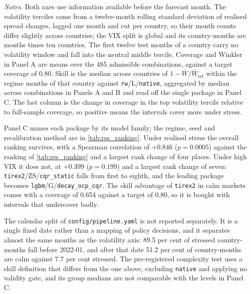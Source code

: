 \begin{table}[t]
\vspace{4pt}
{\footnotesize
\begin{minipage}{0.98\textwidth}
\textit{Notes.} Both axes use information available before the forecast month. The
volatility terciles come from a twelve-month rolling standard deviation of realised
spread changes, lagged one month and cut per country, so their month counts differ
slightly across countries; the VIX split is global and its country-months are months
times ten countries. The first twelve test months of a country carry no volatility
window and fall into the neutral middle tercile. Coverage and Winkler in Panel A are
means over the 485 admissible combinations, against a target coverage of 0.80. Skill
is the median across countries of $1-\bar W/\bar W_{\mathrm{ref}}$ within the regime
months of that country against \texttt{rw}/L/\texttt{native}, aggregated by median
across combinations in Panels A and B and read off the single package in Panel C.
The last column is the change in coverage in the top volatility tercile relative to
full-sample coverage, so positive means the intervals cover more under stress.

Panel C names each package by its model family; the regime, seed and recalibration
method are in \cref{tab:res_ranking}. Under realised stress the overall ranking
survives, with a Spearman correlation of $+0.846$ ($p=0.0005$) against the ranking
of \cref{tab:res_ranking} and a largest rank change of four places. Under high VIX it
does not, at $+0.399$ ($p=0.199$) and a largest rank change of seven:
\texttt{tirex2}/ZS/\texttt{cqr\_static} falls from first to eighth, and the leading
package becomes \texttt{lgbm}/G/\texttt{decay\_ocp\_cqr}. The skill advantage of
\texttt{tirex2} in calm markets comes with a coverage of 0.654 against a target of
0.80, so it is bought with intervals that undercover badly.

The calendar split of \texttt{config/pipeline.yaml} is not reported separately.
It is a single fixed date rather than a mapping of policy decisions, and it separates
almost the same months as the volatility axis: 89.5 per cent of stressed
country-months fall before 2022-01, and after that date 51.2 per cent of
country-months are calm against 7.7 per cent stressed. The pre-registered complexity
test uses a skill definition that differs from the one above, excluding
\texttt{native} and applying no validity gate, and its group medians are not
comparable with the levels in Panel C.
\end{minipage}}
\end{table}





